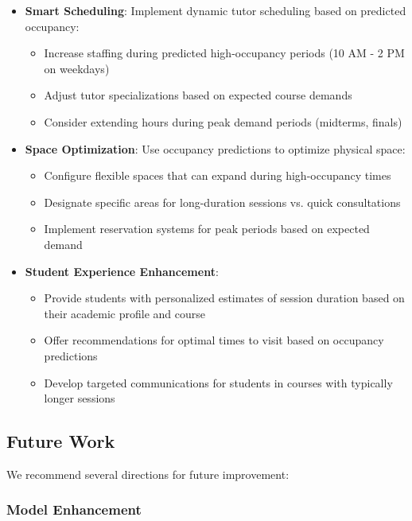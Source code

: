 \documentclass[12pt,letterpaper]{article}
\begin{document}
\begin{itemize}
    \item \textbf{Smart Scheduling}: Implement dynamic tutor scheduling based on predicted occupancy:
    \begin{itemize}
        \item Increase staffing during predicted high-occupancy periods (10 AM - 2 PM on weekdays)
        \item Adjust tutor specializations based on expected course demands
        \item Consider extending hours during peak demand periods (midterms, finals)
    \end{itemize}
    
    \item \textbf{Space Optimization}: Use occupancy predictions to optimize physical space:
    \begin{itemize}
        \item Configure flexible spaces that can expand during high-occupancy times
        \item Designate specific areas for long-duration sessions vs. quick consultations
        \item Implement reservation systems for peak periods based on expected demand
    \end{itemize}
    
    \item \textbf{Student Experience Enhancement}:
    \begin{itemize}
        \item Provide students with personalized estimates of session duration based on their academic profile and course
        \item Offer recommendations for optimal times to visit based on occupancy predictions
        \item Develop targeted communications for students in courses with typically longer sessions
    \end{itemize}
\end{itemize}

\subsection{Future Work}

We recommend several directions for future improvement:

\subsubsection{Model Enhancement}
\end{document}
